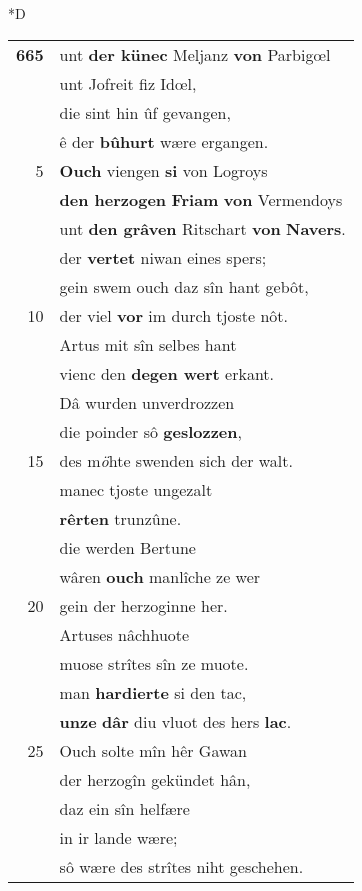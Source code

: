 \documentclass[8pt,a4paper,notitlepage]{article}
\begin{document}
\begin{table}[ht]
\begin{minipage}[t]{0.5\linewidth}
\small
\begin{center}*D
\end{center}
\begin{tabular}{rl}
\textbf{665} & unt \textbf{der künec} Meljanz \textbf{von} Parbigœl\\ 
 & unt Jofreit fiz Idœl,\\ 
 & die sint hin ûf gevangen,\\ 
 & ê der \textbf{bûhurt} wære ergangen.\\ 
5 & \textbf{Ouch} viengen \textbf{si} von Logroys\\ 
 & \textbf{den herzogen} \textbf{Friam} \textbf{von} Vermendoys\\ 
 & unt \textbf{den grâven} Ritschart \textbf{von} \textbf{Navers}.\\ 
 & der \textbf{vertet} niwan eines spers;\\ 
 & gein swem ouch daz sîn hant gebôt,\\ 
10 & der viel \textbf{vor} im durch tjoste nôt.\\ 
 & Artus mit sîn selbes hant\\ 
 & vienc den \textbf{degen wert} erkant.\\ 
 & Dâ wurden unverdrozzen\\ 
 & die poinder sô \textbf{geslozzen},\\ 
15 & des m\textit{ö}hte swenden sich der walt.\\ 
 & manec tjoste ungezalt\\ 
 & \textbf{rêrten} trunzûne.\\ 
 & die werden Bertune\\ 
 & wâren \textbf{ouch} manlîche ze wer\\ 
20 & gein der herzoginne her.\\ 
 & Artuses nâchhuote\\ 
 & muose strîtes sîn ze muote.\\ 
 & man \textbf{hardierte} si den tac,\\ 
 & \textbf{unze} \textbf{dâr} diu vluot des hers \textbf{lac}.\\ 
25 & Ouch solte mîn hêr Gawan\\ 
 & der herzogîn gekündet hân,\\ 
 & daz ein sîn helfære\\ 
 & in ir lande wære;\\ 
 & sô wære des strîtes niht geschehen.\\ 

\end{tabular}
\end{minipage}
\end{table}
\end{document}
